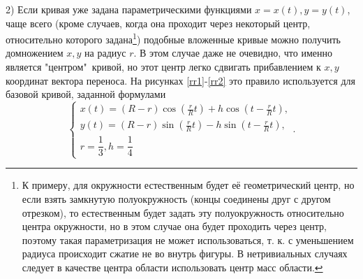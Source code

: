 \documentclass[a4paper]{article}
\begin{document}
  2) Если кривая уже задана параметрическими функциями $x=x(t),y=y(t)$,
        чаще всего (кроме случаев, когда она проходит через некоторый центр,
        относительно которого задана\footnote{К примеру, для окружности естественным будет её геометрический центр, но если взять замкнутую полуокружность (концы соединены друг с другом отрезком), то естественным будет задать эту полуокружность относительно центра окружности, но в этом случае она будет проходить через центр, поэтому такая параметризация не может использоваться, т. к. с уменьшением радиуса происходит сжатие не во внутрь фигуры. В нетривиальных случаях следует в качестве центра области использовать центр масс области.}) подобные вложенные кривые можно получить домножением $x,y$ на радиус $r$.
        В этом случае даже не очевидно, что именно является "центром"\ кривой, но этот центр легко сдвигать прибавлением к $x,y$ координат вектора переноса.
        На рисунках \ref{rr1}-\ref{rr2} это правило используется для базовой кривой, заданной формулами
        \[
          \begin{cases}
            x(t)=(R-r)\cos\left(\frac{r}{R}t\right)+h \cos \left(t-\frac{r}{R}t\right), \\
            y(t)=(R-r)\sin\left(\frac{r}{R}t\right)-h \sin \left(t-\frac{r}{R}t\right), \\
            r=\dfrac{1}{3}, h=\dfrac{1}{4}
          \end{cases}.
        \]
\end{document}
